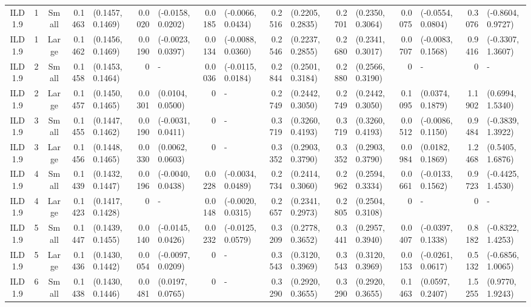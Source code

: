 \begin{landscape}
\begin{table}
\begin{tabular}{cccrlrlrlrlrlrlrl}
ILD1.9	&	1	&	Small	&	0.1463	&	(0.1457, 0.1469)	&	0.0020	&	(-0.0158, 0.0202)	&	0.0185	&	(-0.0066, 0.0434)	&	0.2516	&	(0.2205, 0.2835)	&	0.2701	&	(0.2350, 0.3064)	&	0.0075	&	(-0.0554, 0.0804)	&	0.3076	&	(-0.8604, 0.9727)	\\
ILD1.9	&	1	&	Large	&	0.1462	&	(0.1456, 0.1469)	&	0.0190	&	(-0.0023, 0.0397)	&	0.0134	&	(-0.0088, 0.0360)	&	0.2546	&	(0.2237, 0.2855)	&	0.2680	&	(0.2341, 0.3017)	&	0.0707	&	(-0.0083, 0.1568)	&	0.9416	&	(-0.3307, 1.3607)	\\
ILD1.9	&	2	&	Small	&	0.1458	&	(0.1453, 0.1464)	&	0	&	-	&	0.0036	&	(-0.0115, 0.0184)	&	0.2844	&	(0.2501, 0.3184)	&	0.2880	&	(0.2566, 0.3190)	&	0	&	-	&	0	&	-	\\
ILD1.9	&	2	&	Large	&	0.1457	&	(0.1450, 0.1465)	&	0.0301	&	(0.0104, 0.0500)	&	0	&	-	&	0.2749	&	(0.2442, 0.3050)	&	0.2749	&	(0.2442, 0.3050)	&	0.1095	&	(0.0374, 0.1879)	&	1.1902	&	(0.6994, 1.5340)	\\
ILD1.9	&	3	&	Small	&	0.1455	&	(0.1447, 0.1462)	&	0.0190	&	(-0.0031, 0.0411)	&	0	&	-	&	0.3719	&	(0.3260, 0.4193)	&	0.3719	&	(0.3260, 0.4193)	&	0.0512	&	(-0.0086, 0.1150)	&	0.9484	&	(-0.3839, 1.3922)	\\
ILD1.9	&	3	&	Large	&	0.1456	&	(0.1448, 0.1465)	&	0.0330	&	(0.0062, 0.0603)	&	0	&	-	&	0.3352	&	(0.2903, 0.3790)	&	0.3352	&	(0.2903, 0.3790)	&	0.0984	&	(0.0182, 0.1869)	&	1.2468	&	(0.5405, 1.6876)	\\
ILD1.9	&	4	&	Small	&	0.1439	&	(0.1432, 0.1447)	&	0.0196	&	(-0.0040, 0.0438)	&	0.0228	&	(-0.0034, 0.0489)	&	0.2734	&	(0.2414, 0.3060)	&	0.2962	&	(0.2594, 0.3334)	&	0.0661	&	(-0.0133, 0.1562)	&	0.9723	&	(-0.4425, 1.4530)	\\
ILD1.9	&	4	&	Large	&	0.1423	&	(0.1417, 0.1428)	&	0	&	-	&	0.0148	&	(-0.0020, 0.0315)	&	0.2657	&	(0.2341, 0.2973)	&	0.2805	&	(0.2504, 0.3108)	&	0	&	-	&	0	&	-	\\
ILD1.9	&	5	&	Small	&	0.1447	&	(0.1439, 0.1455)	&	0.0140	&	(-0.0145, 0.0426)	&	0.0232	&	(-0.0125, 0.0579)	&	0.3209	&	(0.2778, 0.3652)	&	0.3441	&	(0.2957, 0.3940)	&	0.0407	&	(-0.0397, 0.1338)	&	0.8182	&	(-0.8322, 1.4253)	\\
ILD1.9	&	5	&	Large	&	0.1436	&	(0.1430, 0.1442)	&	0.0054	&	(-0.0097, 0.0209)	&	0	&	-	&	0.3543	&	(0.3120, 0.3969)	&	0.3543	&	(0.3120, 0.3969)	&	0.0153	&	(-0.0261, 0.0617)	&	0.5132	&	(-0.6856, 1.0065)	\\
ILD1.9	&	6	&	Small	&	0.1438	&	(0.1430, 0.1446)	&	0.0481	&	(0.0197, 0.0765)	&	0	&	-	&	0.3290	&	(0.2920, 0.3655)	&	0.3290	&	(0.2920, 0.3655)	&	0.1463	&	(0.0597, 0.2407)	&	1.5255	&	(0.9770, 1.9243)	\\

\end{tabular}
\end{table}
\end{landscape}
